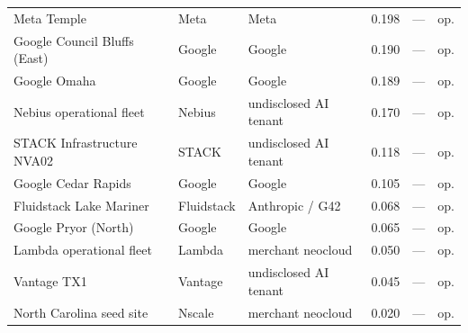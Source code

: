 \begin{small}
\begin{longtable}{@{}p{4.5cm} p{2.4cm} p{2.4cm} r r p{1.8cm}@{}}
Meta Temple & Meta & Meta & 0.198 & — & op. \\

Google Council Bluffs (East) & Google & Google & 0.190 & — & op. \\

Google Omaha & Google & Google & 0.189 & — & op. \\

Nebius operational fleet & Nebius & undisclosed AI tenant & 0.170 & — & op. \\

STACK Infrastructure NVA02 & STACK & undisclosed AI tenant & 0.118 & — & op. \\

Google Cedar Rapids & Google & Google & 0.105 & — & op. \\

Fluidstack Lake Mariner & Fluidstack & Anthropic / G42 & 0.068 & — & op. \\

Google Pryor (North) & Google & Google & 0.065 & — & op. \\

Lambda operational fleet & Lambda & merchant neocloud & 0.050 & — & op. \\

Vantage TX1 & Vantage & undisclosed AI tenant & 0.045 & — & op. \\

North Carolina seed site & Nscale & merchant neocloud & 0.020 & — & op. \\

\end{longtable}\end{small}


